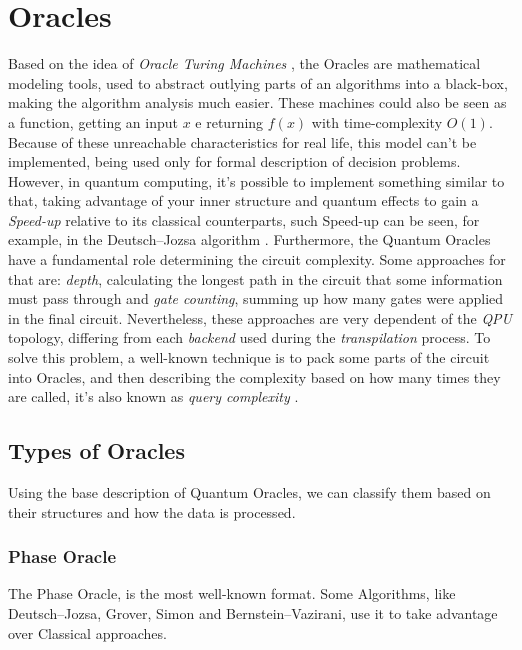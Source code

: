 \documentclass{article}
\begin{document}
\section{Oracles}
Based on the idea of \emph{Oracle Turing Machines} \cite{SOARE2009368}\cite{amreen_oracle}\cite{kalyanasyndaram_2021_mod04lec23}\cite{e21080800}, the Oracles are mathematical modeling tools, used to abstract outlying parts of an algorithms into a black-box, making the algorithm analysis much easier. These machines could also be seen as a function, getting an input $x$ e returning $f(x)$ with time-complexity $O(1)$. Because of these unreachable characteristics for real life, this model can't be implemented, being used only for formal description of decision problems.\\
However, in quantum computing, it's possible to implement something similar to that, taking advantage of your inner structure and quantum effects to gain a \emph{Speed-up} relative to its classical counterparts, such Speed-up can be seen, for example, in the Deutsch–Jozsa algorithm \cite{Fan_2007}. Furthermore, the Quantum Oracles have a fundamental role determining the circuit complexity. Some approaches for that are: \emph{depth}, calculating the longest path in the circuit that some information must pass through and \emph{gate counting}, summing up how many gates were applied in the final circuit. Nevertheless, these approaches are very dependent of the \emph{QPU} topology, differing from each \emph{backend} used during the \emph{transpilation} process. To solve this problem, a well-known technique is to pack some parts of the circuit into Oracles, and then describing the complexity based on how many times they are called, it's also known as \emph{query complexity} \cite{odonnell_2015_lecture} \cite{e21080800}.

\subsection{Types of Oracles}
Using the base description of Quantum Oracles, we can classify them based on their structures and how the data is processed.

\subsubsection{Phase Oracle}
The Phase Oracle, is the most well-known format. Some Algorithms, like Deutsch–Jozsa, Grover, Simon and Bernstein–Vazirani, use it to take advantage over Classical approaches.
\end{document}
